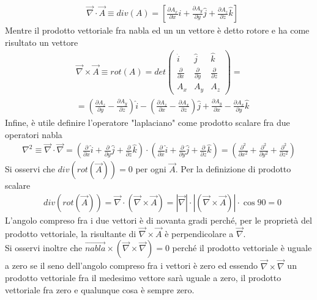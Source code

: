 \begin{align*}
&\vec{\nabla} \cdot \vec{A} \equiv div(A) = [\frac{\partial A_x}{\partial x} \hat{i}+\frac{\partial A_y}{\partial y} \hat{j}+\frac{\partial A_z}{\partial z} \hat{k}]
\end{align*}
Mentre il prodotto vettoriale fra nabla ed un un vettore è detto rotore e ha come risultato un vettore
\begin{align*}
&\vec{\nabla} \times \vec{A} \equiv rot(A) = det 
\begin{pmatrix}
\hat{i} & \hat{j} & \hat{k}\\
\frac{\partial}{\partial x} & \frac{\partial}{\partial y} & \frac{\partial}{\partial z}\\
A_x & A_y & A_z
\end{pmatrix} = \\
& = (\frac{\partial A_z}{\partial y}-\frac{\partial A_y}{\partial z})\hat{i}-(\frac{\partial A_z}{\partial x}-\frac{\partial A_x}{\partial z}) \hat{j} + \frac{\partial A_y}{\partial x}-\frac{\partial A_x}{\partial y} \hat{k}
\end{align*}
Infine, è utile definire l'operatore "laplaciano" come prodotto scalare fra due operatori nabla
\begin{align*}
\nabla^2 \equiv \vec{\nabla} \cdot \vec{\nabla} = (\frac{\partial }{\partial x} \hat{i}+\frac{\partial }{\partial y} \hat{j}+\frac{\partial }{\partial z} \hat{k} ) \cdot (\frac{\partial }{\partial x} \hat{i}+\frac{\partial }{\partial y} \hat{j}+\frac{\partial }{\partial z} \hat{k} ) = (\frac{\partial^2 }{\partial x^2} +\frac{\partial^2 }{\partial y^2} +\frac{\partial^2 }{\partial z^2} )
\end{align*}	
Si osservi che $div(rot(\vec{A}))=0$ per ogni $\vec{A}$. Per la definizione di prodotto scalare
\begin{align*}
&div(rot(\vec{A})) = \vec{\nabla} \cdot (\vec{\nabla} \times \vec{A}) = |\vec{\nabla}| \cdot |(\vec{\nabla} \times \vec{A})| \cdot \cos90 = 0 
\end{align*}
L'angolo compreso fra i due vettori è di novanta gradi perché, per le proprietà del prodotto vettoriale, la risultante di $\vec{\nabla} \times \vec{A}$ è perpendicolare a $\vec{\nabla}$.\\
Si osservi inoltre che $\vec{nabla} \times (\vec{\nabla} \times \vec{\nabla}) = 0$ perché il prodotto vettoriale è uguale a zero se il seno dell'angolo compreso fra i vettori è zero ed essendo $\vec{\nabla} \times \vec{\nabla}$ un prodotto vettoriale fra il medesimo vettore sarà uguale a zero, il prodotto vettoriale fra zero e qualunque cosa è sempre zero.

